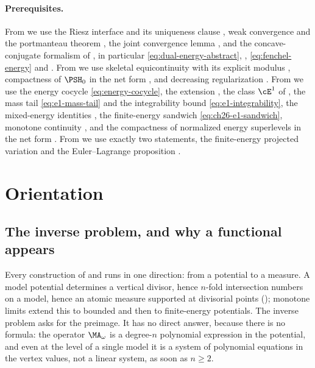 \paragraph{Prerequisites.}
From  we use the Riesz interface
 and its uniqueness clause
, weak convergence and the portmanteau theorem
, the joint convergence lemma
, and the concave-conjugate formalism of
, in particular
\eqref{eq:dual-energy-abstract}, ,
\eqref{eq:fenchel-energy} and .  From
 we use skeletal equicontinuity
 with its explicit modulus
, compactness of \(\PSH_0\)
 in the net form
, and decreasing regularization
.  From  we
use the energy cocycle \eqref{eq:energy-cocycle}, the extension
, the class \(\cE^1\) of , the
mass tail \eqref{eq:e1-mass-tail} and the integrability bound
\eqref{eq:e1-integrability}, the mixed-energy identities
, the finite-energy sandwich
\eqref{eq:ch26-e1-sandwich}, monotone continuity
, and the compactness of normalized
energy superlevels  in the net form
.  From
 we use exactly two statements, the
finite-energy projected variation  and the
Euler--Lagrange proposition .

\section{Orientation}
\label{sec:ch28-orientation}

\subsection{The inverse problem, and why a functional appears}
\label{sec:ch28-inverse}

Every construction of  and  runs in
one direction: from a potential to a measure.  A model potential determines
a vertical divisor, hence \(n\)-fold intersection numbers on a model, hence
an atomic measure supported at divisorial points
(); monotone limits extend this to bounded and
then to finite-energy potentials.  The inverse problem asks for the
preimage.  It has no direct answer, because there is no formula: the
operator \(\MA_\omega\) is a degree-\(n\) polynomial expression in the
potential, and even at the level of a single model it is a system of
polynomial equations in the vertex values, not a linear system, as soon as
\(n\geq2\).

